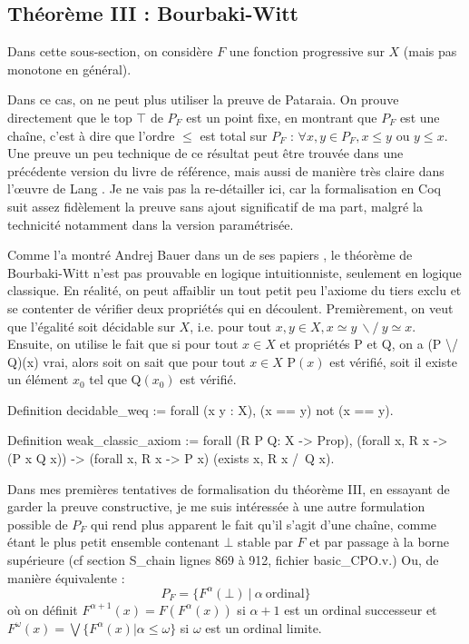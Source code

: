 \documentclass{article}
\newcommand\code[1]{{\fontfamily{lmtt}\selectfont #1}}
\theoremstyle{definition}
\begin{document}
\subsection{Théorème III : Bourbaki-Witt}

Dans cette sous-section, on considère $F$ une fonction progressive sur $X$ (mais pas monotone en général).

Dans ce cas, on ne peut plus utiliser la preuve de Pataraia. On prouve directement que le top $\top$ de $P_F$ est un point fixe, en montrant que $P_F$ est une chaîne, c'est à dire que l'ordre $\leq$ est total sur $P_F$ : $\forall x, y \in P_F, x \leq y$ ou $y \leq x$. Une preuve un peu technique de ce résultat peut être trouvée dans une précédente version du livre de référence, mais aussi de manière très claire dans l’œuvre de Lang \cite{lang02}.
Je ne vais pas la re-détailler ici, car la formalisation en Coq suit assez fidèlement la preuve sans ajout significatif de ma part, malgré la technicité notamment dans la version paramétrisée.

\medskip

Comme l'a montré Andrej Bauer dans un de ses papiers \cite{bw}, le théorème de Bourbaki-Witt n'est pas prouvable en logique intuitionniste, seulement en logique classique. En réalité, on peut affaiblir un tout petit peu l'axiome du tiers exclu et se contenter de vérifier deux propriétés qui en découlent. Premièrement, on veut que l'égalité soit décidable sur $X$, i.e. pour tout $x, y \in X, x \simeq y ~ \backslash/ ~ y \simeq x$. Ensuite, on utilise le fait que si pour tout $x \in X$ et propriétés \code{P} et \code{Q}, on a \code{(P \textbackslash/ Q)(x)} vrai, alors soit on sait que pour tout $x \in X$ \code{P}$(x)$ est vérifié, soit il existe un élément $x_0$ tel que \code{Q}$(x_0)$ est vérifié.

\begin{coq}
Definition decidable_weq := forall (x y : X), (x == y) \/ not (x == y).

Definition weak_classic_axiom := forall (R P Q: X -> Prop),
	(forall x, R x -> (P x \/ Q x))
    -> (forall x, R x -> P x) \/ (exists x, R x /\ Q x).

\end{coq}

\medskip

Dans mes premières tentatives de formalisation du théorème III, en essayant de garder la preuve constructive, je me suis intéressée à une autre formulation possible de $P_F$ qui rend plus apparent le fait qu'il s'agit d'une chaîne, comme étant le plus petit ensemble contenant $\bot$ stable par $F$ et par passage à la borne supérieure (cf section \code{S\_chain} lignes 869 à 912, fichier \code{basic\_CPO.v}.) Ou, de manière équivalente :
$$ P_F = \{ F^\alpha(\bot) ~ | ~ \alpha ~ \text{ordinal} \}$$
où on définit $F^{\alpha + 1}(x) = F(F^\alpha(x))$ si $\alpha + 1$ est un ordinal successeur et $F^\omega(x) = \bigvee \{ F^\alpha(x) | \alpha \leqslant \omega \}$ si $\omega$ est un ordinal limite.
\end{document}
